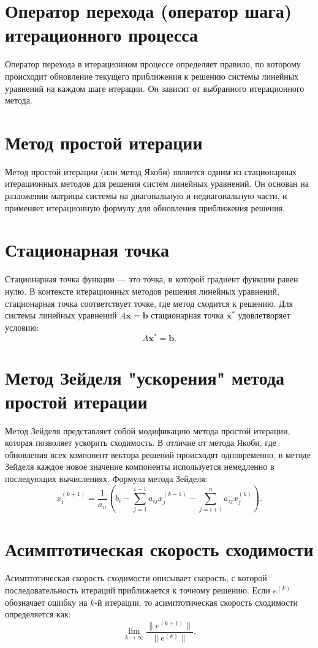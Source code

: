 \documentclass{article}
\begin{document}
\section{Оператор перехода (оператор шага) итерационного процесса}
Оператор перехода в итерационном процессе определяет правило, по которому происходит обновление текущего приближения к решению системы линейных уравнений на каждом шаге итерации. Он зависит от выбранного итерационного метода.

\section{Метод простой итерации}
Метод простой итерации (или метод Якоби) является одним из стационарных итерационных методов для решения систем линейных уравнений. Он основан на разложении матрицы системы на диагональную и недиагональную части, и применяет итерационную формулу для обновления приближения решения.

\section{Стационарная точка}
Стационарная точка функции — это точка, в которой градиент функции равен нулю. В контексте итерационных методов решения линейных уравнений, стационарная точка соответствует точке, где метод сходится к решению. Для системы линейных уравнений $A\mathbf{x} = \mathbf{b}$ стационарная точка $\mathbf{x}^*$ удовлетворяет условию:
\[
A\mathbf{x}^* = \mathbf{b}.
\]

\section{Метод Зейделя "ускорения" метода простой итерации}
Метод Зейделя представляет собой модификацию метода простой итерации, которая позволяет ускорить сходимость. В отличие от метода Якоби, где обновления всех компонент вектора решений происходят одновременно, в методе Зейделя каждое новое значение компоненты используется немедленно в последующих вычислениях. Формула метода Зейделя:
\[
x_i^{(k+1)} = \frac{1}{a_{ii}} \left( b_i - \sum_{j=1}^{i-1} a_{ij} x_j^{(k+1)} - \sum_{j=i+1}^{n} a_{ij} x_j^{(k)} \right).
\]

\section{Асимптотическая скорость сходимости}
Асимптотическая скорость сходимости описывает скорость, с которой последовательность итераций приближается к точному решению. Если $e^{(k)}$ обозначает ошибку на $k$-й итерации, то асимптотическая скорость сходимости определяется как:
\[
\lim_{k \to \infty} \frac{\|e^{(k+1)}\|}{\|e^{(k)}\|}.
\]
\end{document}
